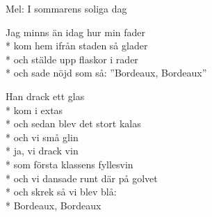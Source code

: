 \begin{SongText}
    \begin{SongInfo}
        Mel: I sommarens soliga dag
    \end{SongInfo}
    \begin{SongVerse}
        Jag minns än idag hur min fader\\*%
        kom hem ifrån staden så glader\\*%
        och stälde upp flaskor i rader\\*%
        och sade nöjd som så: ”Bordeaux, Bordeaux”
    \end{SongVerse}
    \begin{SongVerse}
        Han drack ett glas\\*%
        kom i extas\\*%
        och sedan blev det stort kalas\\*%
        och vi små glin\\*%
        ja, vi drack vin\\*%
        som första klassens fyllesvin\\*%
        och vi dansade runt där på golvet\\*%
        och skrek så vi blev blå:\\*%
        Bordeaux, Bordeaux
    \end{SongVerse}
\end{SongText}
